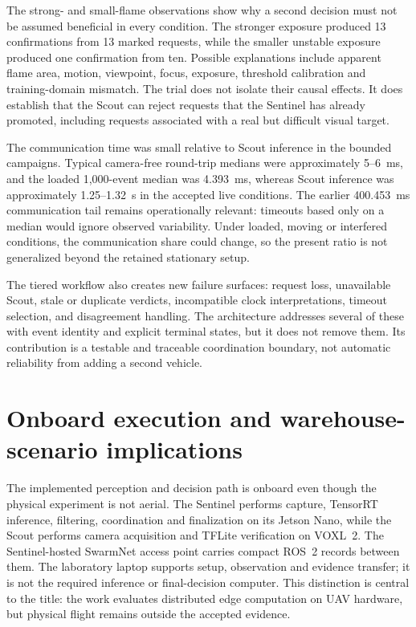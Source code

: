 The strong- and small-flame observations show why a second decision must not be
assumed beneficial in every condition. The stronger exposure produced 13
confirmations from 13 marked requests, while the smaller unstable exposure
produced one confirmation from ten. Possible explanations include apparent
flame area, motion, viewpoint, focus, exposure, threshold calibration and
training-domain mismatch. The trial does not isolate their causal effects. It
does establish that the Scout can reject requests that the Sentinel has already
promoted, including requests associated with a real but difficult visual
target.

The communication time was small relative to Scout inference in the bounded
campaigns. Typical camera-free round-trip medians were approximately 5--6~ms,
and the loaded 1,000-event median was 4.393~ms, whereas
Scout inference was approximately 1.25--1.32~s in the accepted live conditions.
The earlier 400.453~ms communication tail remains operationally relevant:
timeouts based only on a median would ignore observed variability. Under
loaded, moving or interfered conditions, the communication share could change,
so the present ratio is not generalized beyond the retained stationary setup.

The tiered workflow also creates new failure surfaces: request loss, unavailable Scout,
stale or duplicate verdicts, incompatible clock interpretations, timeout
selection, and disagreement handling. The architecture addresses several of
these with event identity and explicit terminal states, but it does not remove
them. Its contribution is a testable and traceable coordination boundary, not
automatic reliability from adding a second vehicle.

\section{Onboard execution and warehouse-scenario implications}
\label{sec:discussion:onboard}

The implemented perception and decision path is onboard even though the
physical experiment is not aerial. The Sentinel performs capture, TensorRT
inference, filtering, coordination and finalization on its Jetson Nano, while
the Scout performs camera acquisition and TFLite verification on VOXL~2. The
Sentinel-hosted SwarmNet access point carries compact ROS~2 records between
them. The laboratory laptop supports setup, observation and evidence transfer;
it is not the required inference or final-decision computer. This distinction
is central to the title: the work evaluates distributed edge computation on
UAV hardware, but physical flight remains outside the accepted evidence.

